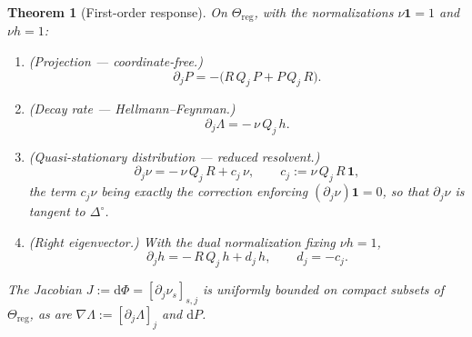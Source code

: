 \documentclass[11pt,reqno]{amsart}
\theoremstyle{plain}
\newtheorem{theorem}{Theorem}[section]
\theoremstyle{definition}
\theoremstyle{remark}
\newcommand{\Reg}{\Theta_{\mathrm{reg}}}
\newcommand{\Simp}{\Delta^{\!\circ}}
\newcommand{\one}{\mathbf{1}}
\newcommand{\dd}{\mathrm{d}}
\begin{document}
\begin{theorem}[First-order response]\label{thm:response}
On $\Reg$, with the normalizations $\nu\one=1$ and $\nu h=1$:
\begin{enumerate}[label=\textup{(\alph*)}]
\item \textup{(Projection --- coordinate-free.)}
\begin{equation}\label{eq:dP}
\partial_j P=-\bigl(R\,Q_j\,P+P\,Q_j\,R\bigr).
\end{equation}
\item \textup{(Decay rate --- Hellmann--Feynman.)}
\begin{equation}\label{eq:dLambda}
\partial_j\Lambda=-\,\nu\,Q_j\,h .
\end{equation}
\item \textup{(Quasi-stationary distribution --- reduced resolvent.)}
\begin{equation}\label{eq:dnu}
\partial_j\nu=-\,\nu\,Q_j\,R+c_j\,\nu,\qquad c_j:=\nu\,Q_j\,R\,\one,
\end{equation}
the term $c_j\nu$ being exactly the correction enforcing
$(\partial_j\nu)\one=0$, so that $\partial_j\nu$ is tangent to $\Simp$.
\item \textup{(Right eigenvector.)} With the dual normalization fixing $\nu h=1$,
\begin{equation}\label{eq:dh}
\partial_j h=-\,R\,Q_j\,h+d_j\,h,\qquad d_j=-c_j .
\end{equation}
\end{enumerate}
The Jacobian $J:=\dd\Phi=[\partial_j\nu_s]_{s,j}$ is uniformly bounded on compact
subsets of $\Reg$, as are $\nabla\Lambda:=[\partial_j\Lambda]_j$ and $\dd P$.
\end{theorem}
\end{document}
